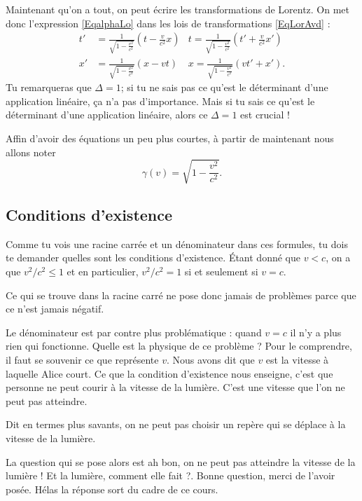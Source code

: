 \documentclass[a4paper,12pt]{book}
\theoremstyle{mes_exemples}	\newtheorem{exemple}[numtho]{Exemple}
\theoremstyle{mes_tho}
\begin{document}
Maintenant qu'on a tout, on peut écrire les transformations de Lorentz. On met donc l'expression \eqref{EqalphaLo} dans les lois de transformations \eqref{EqLorAvd} :
\begin{equation}
\begin{aligned}		\label{EqTrLorentz}
  t'&= \frac{1}{ \sqrt{1-\frac{ v^2 }{ c^2 }} }\left( t-\frac{ v }{ c^2 }x \right)	& t=	\frac{1}{ \sqrt{1-\frac{ v^2 }{ c^2 }} }\left(t'+\frac{ v }{ c^2 }x'\right)\\
x'&=\frac{1}{ \sqrt{1-\frac{ v^2 }{ c^2 }} }(x-vt)	&x=\frac{1}{ \sqrt{1-\frac{ v^2 }{ c^2 }} }(vt'+x').
\end{aligned}
\end{equation}
Tu remarqueras que $\Delta=1$; si tu ne sais pas ce qu'est le déterminant d'une application linéaire, ça n'a pas d'importance. Mais si tu sais ce qu'est le déterminant d'une application linéaire, alors ce $\Delta=1$ est crucial !

Affin d'avoir des équations un peu plus courtes, à partir de maintenant nous allons noter
\[ 
  \gamma(v)=\sqrt{1-\frac{ v^2 }{ c^2 }}.
\]


\subsection{Conditions d'existence}

Comme tu vois une racine carrée et un dénominateur dans ces formules, tu dois te demander quelles sont les conditions d'existence. Étant donné que $v<c$, on a que $v^2/c^2\leq 1$ et en particulier, $v^2/c^2=1$ si et seulement si $v=c$. 

Ce qui se trouve dans la racine carré ne pose donc jamais de problèmes parce que ce n'est jamais négatif. 

Le dénominateur est par contre plus problématique : quand $v=c$ il n'y a plus rien qui fonctionne. Quelle est la physique de ce problème ? Pour le comprendre, il faut se souvenir ce que représente $v$. Nous avons dit que $v$ est la vitesse à laquelle Alice court. Ce que la condition d'existence nous enseigne, c'est que personne ne peut courir à la vitesse de la lumière. C'est une vitesse que l'on ne peut pas atteindre. 

Dit en termes plus savants, on ne peut pas choisir un repère qui se déplace à la vitesse de la lumière.

La question qui se pose alors est \og ah bon, on ne peut pas atteindre la vitesse de la lumière ! Et la lumière, comment elle fait ?\fg. Bonne question, merci de l'avoir posée. Hélas la réponse sort du cadre de ce cours.
\end{document}
